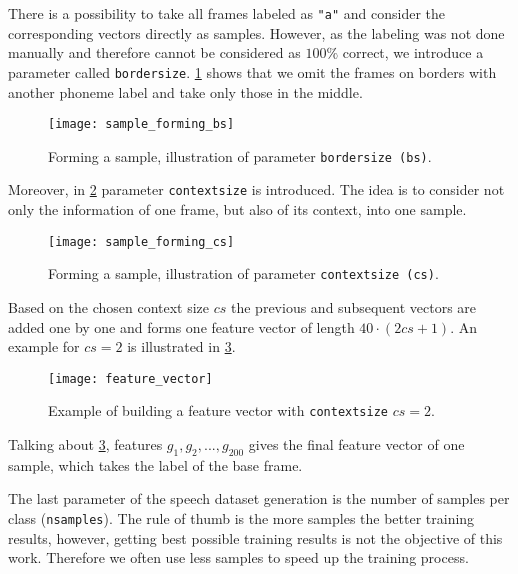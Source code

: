 There is a possibility to take all frames labeled as \texttt{"a"} and consider the corresponding vectors directly as samples. However, as the labeling was not done manually and therefore cannot be considered as $ 100\% $ correct, we introduce a parameter called \texttt{border\textunderscore size}. \cref{fig:methods:sample_forming_bs} shows that we omit the frames on borders with another phoneme label and take only those in the middle.

\begin{figure}[H]
\centering
\texttt{[image: sample\_forming\_bs]}
\caption{Forming a sample, illustration of parameter \texttt{border\textunderscore size (bs)}.}
\label{fig:methods:sample_forming_bs}
\end{figure}

Moreover, in \cref{fig:methods:sample_forming_cs} parameter \texttt{context\textunderscore size} is introduced. The idea is to consider not only the information of one frame, but also of its context, into one sample.

\begin{figure}[H]
\centering
\texttt{[image: sample\_forming\_cs]}
\caption{Forming a sample, illustration of parameter \texttt{context\textunderscore size (cs)}.}
\label{fig:methods:sample_forming_cs}
\end{figure}

Based on the chosen context size $ cs $ the previous and subsequent vectors are added one by one and forms one feature vector of length $ 40 \cdot (2cs+1) $. An example for $ cs = 2 $ is illustrated in \cref{fig:methods:feature_vector}.

\begin{figure}[H]
\centering
\texttt{[image: feature\_vector]}
\caption{Example of building a feature vector with \texttt{context\textunderscore size} $ cs = 2 $.}
\label{fig:methods:feature_vector}
\end{figure}

Talking about \cref{fig:methods:feature_vector}, features $ g_1, g_2, ..., g_{200} $ gives the final feature vector of one sample, which takes the label of the base frame.

The last parameter of the speech dataset generation is the number of samples per class (\texttt{n\textunderscore samples}). The rule of thumb is the more samples the better training results, however, getting best possible training results is not the objective of this work. Therefore we often use less samples to speed up the training process.

